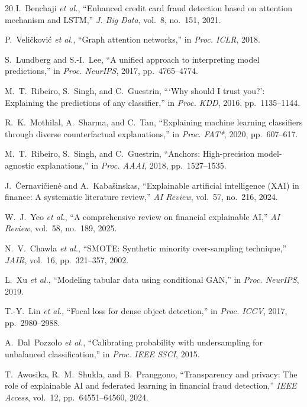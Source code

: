 \documentclass[10pt,a4paper,twocolumn]{article}
\begin{document}
{\begin{thebibliography}{20}
I.~Benchaji \textit{et al.}, ``Enhanced credit card fraud detection based on attention mechanism and LSTM,'' \textit{J. Big Data}, vol.~8, no.~151, 2021.

P.~Veli{\v{c}}kovi{\'c} \textit{et al.}, ``Graph attention networks,'' in \textit{Proc. ICLR}, 2018.

S.~Lundberg and S.-I.~Lee, ``A unified approach to interpreting model predictions,'' in \textit{Proc. NeurIPS}, 2017, pp.~4765--4774.

M.~T.~Ribeiro, S.~Singh, and C.~Guestrin, ```Why should I trust you?': Explaining the predictions of any classifier,'' in \textit{Proc. KDD}, 2016, pp.~1135--1144.

R.~K.~Mothilal, A.~Sharma, and C.~Tan, ``Explaining machine learning classifiers through diverse counterfactual explanations,'' in \textit{Proc. FAT*}, 2020, pp.~607--617.

M.~T.~Ribeiro, S.~Singh, and C.~Guestrin, ``Anchors: High-precision model-agnostic explanations,'' in \textit{Proc. AAAI}, 2018, pp.~1527--1535.

J.~{\v{C}}ernavi{\v{c}}ien{\.e} and A.~Kaba{\v{s}}inskas, ``Explainable artificial intelligence (XAI) in finance: A systematic literature review,'' \textit{AI Review}, vol.~57, no.~216, 2024.

W.~J.~Yeo \textit{et al.}, ``A comprehensive review on financial explainable AI,'' \textit{AI Review}, vol.~58, no.~189, 2025.

N.~V.~Chawla \textit{et al.}, ``SMOTE: Synthetic minority over-sampling technique,'' \textit{JAIR}, vol.~16, pp.~321--357, 2002.

L.~Xu \textit{et al.}, ``Modeling tabular data using conditional GAN,'' in \textit{Proc. NeurIPS}, 2019.

T.-Y.~Lin \textit{et al.}, ``Focal loss for dense object detection,'' in \textit{Proc. ICCV}, 2017, pp.~2980--2988.

A.~Dal~Pozzolo \textit{et al.}, ``Calibrating probability with undersampling for unbalanced classification,'' in \textit{Proc. IEEE SSCI}, 2015.

T.~Awosika, R.~M.~Shukla, and B.~Pranggono, ``Transparency and privacy: The role of explainable AI and federated learning in financial fraud detection,'' \textit{IEEE Access}, vol.~12, pp.~64551--64560, 2024.


\end{thebibliography}}
\end{document}

